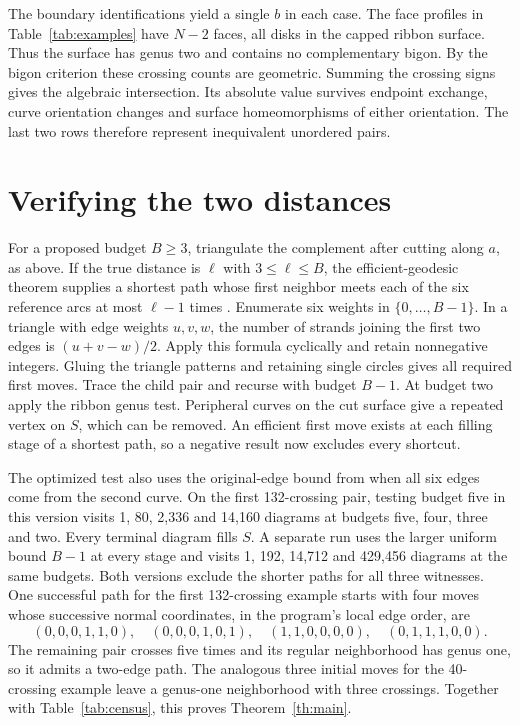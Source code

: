 \documentclass[11pt,a4paper]{article}
\begin{document}
The boundary identifications yield a single \(b\) in each case. The face
profiles in Table~\ref{tab:examples} have \(N-2\) faces, all disks in the
capped ribbon surface. Thus the surface has genus two and contains no
complementary bigon. By the bigon criterion these crossing counts are geometric.
Summing the crossing signs gives the algebraic intersection. Its absolute
value survives endpoint exchange, curve orientation changes and surface
homeomorphisms of either orientation. The last two rows therefore represent
inequivalent unordered pairs.

\clearpage
\section{Verifying the two distances}
For a proposed budget \(B\ge3\), triangulate the complement after cutting
along \(a\), as above. If the true distance is \(\ell\) with \(3\le\ell\le B\),
the efficient-geodesic theorem supplies a shortest path whose first neighbor
meets each of the six reference arcs at most \(\ell-1\) times
\cite[Thm.~1.1 and pp.~3--4]{BMM}. Enumerate six weights in
\(\{0,\ldots,B-1\}\). In a triangle with edge weights \(u,v,w\), the number
of strands joining the first two edges is \((u+v-w)/2\). Apply this formula
cyclically and retain nonnegative integers. Gluing the triangle patterns and
retaining single circles gives all required first moves. Trace the child pair
and recurse with budget \(B-1\). At budget two apply the ribbon genus test.
Peripheral curves on the cut surface give a repeated vertex on \(S\), which
can be removed. An efficient first move exists at each filling stage of a
shortest path, so a negative result now excludes every shortcut.

The optimized test also uses the original-edge bound from
\cite[Prop.~3.7]{BMM} when all six edges come from the second curve. On the
first 132-crossing pair, testing budget five in this version visits 1, 80, 2,336
and 14,160 diagrams at budgets five, four, three and two. Every terminal
diagram fills \(S\). A separate run uses the larger uniform bound \(B-1\)
at every stage and visits 1, 192, 14,712 and 429,456 diagrams at the same
budgets. Both versions exclude the shorter paths for all three witnesses.
One successful path for the first 132-crossing example starts with four moves
whose successive normal coordinates, in the program's local edge order, are
\[
 (0,0,0,1,1,0),\quad(0,0,0,1,0,1),\quad
 (1,1,0,0,0,0),\quad(0,1,1,1,0,0).
\]
The remaining pair crosses five times and its regular neighborhood has genus
one, so it admits a two-edge path. The analogous three initial moves for the
40-crossing example leave a genus-one neighborhood with three crossings.
Together with Table~\ref{tab:census}, this proves Theorem~\ref{th:main}.
\end{document}

